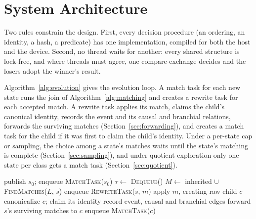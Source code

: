 \section{System Architecture}
\label{sec:architecture}

Two rules constrain the design. First, every decision procedure (an ordering, an identity, a hash,
a predicate) has one implementation, compiled for both the host and the device. Second, no thread
waits for another: every shared structure is lock-free, and where threads must agree, one
compare-exchange decides and the losers adopt the winner's result.

Algorithm~\ref{alg:evolution} gives the evolution loop. A match task for each new state runs the
join of Algorithm~\ref{alg:matching} and creates a rewrite task for each accepted match. A rewrite
task applies its match, claims the child's canonical identity, records the event and its causal
and branchial relations, forwards the surviving matches (Section~\ref{sec:forwarding}), and
creates a match task for the child if it was first to claim the child's identity. Under a per-state
cap or sampling, the choice among a state's matches waits until the state's matching is complete
(Section~\ref{sec:sampling}), and under quotient exploration only one state per class gets a match
task (Section~\ref{sec:quotient}).

\begin{algorithm}[htbp]
\caption{Task-Based Multiway Evolution}
\label{alg:evolution}
\begin{algorithmic}[1]
        \State publish $s_0$; enqueue \textsc{MatchTask}($s_0$)
    \EndFor
        \State $\tau \gets$ \textsc{Dequeue}()
            \State $M \gets$ inherited $\cup$ \textsc{FindMatches}($L$, $s$)
                \State enqueue \textsc{RewriteTask}($s$, $m$)
            \EndFor
            \State apply $m$, creating raw child $c$
            \State canonicalize $c$; claim its identity
            \State record event, causal and branchial edges
            \State forward $s$'s surviving matches to $c$
                \State enqueue \textsc{MatchTask}($c$)
            \EndIf
        \EndIf
    \EndWhile
\EndProcedure
\end{algorithmic}
\end{algorithm}


